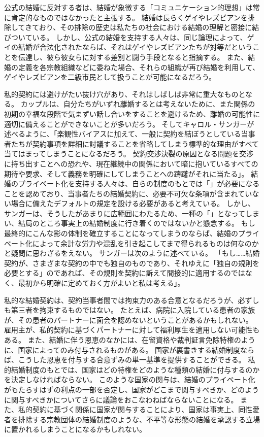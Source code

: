 \documentclass[paper=a4,book,openany]{jlreq} \usepackage{mystyle}
\begin{document}
公式の結婚に反対する者は、結婚が象徴する「コミュニケーション的理想」は常に肯定的なものではなかったと主張する。
結婚は長らくゲイやレズビアンを排除してきており、その排除の歴史は私たちの社会における結婚の理解と密接に結びついている。
しかし、公式の結婚を支持する人々は、同じ論理によって、ゲイの結婚が合法化されたならば、それはゲイやレズビアンたちが対等だということを伝達し、彼ら彼女らに対する差別と闘う手段となると指摘する。
また、結婚の定義を各宗教組織などに委ねた場合、それらの組織が再び結婚を利用して、ゲイやレズビアンを二級市民として扱うことが可能になるだろう\citep[cf.][p.205]{hartley12:_polit_liber_marriag_famil}。

私的契約には避けがたい抜け穴があり、それはしばしば非常に重大なものとなる。
カップルは、自分たちがいずれ離婚するとは考えないために、また関係の初期の幸福な段階で気まずい話し合いをすることを避けるため、離婚の可能性に適切に備えることができないことが多いだろう。
そしてキャロル・サンガーが述べるように、「楽観性バイアスに加えて、一般に契約を結ぼうとしている当事者たちが契約事項を詳細に討議することを省略してしまう標準的な理由がすべて当てはまってしまうことになるだろう。
契約交渉決裂の原因となる問題を交渉に持ち出すことへの恐れや、現在継続中の関係において暗に抱いているすべての期待や要求、そして義務を明確にしてしまうことへの躊躇がそれに当たる」\citep[p.1315]{sanger06:_case_civil_marriag}。
結婚のプライベート化を支持する人々は、自らの制度のもとでは「」が必要になることを認めており、当事者たちの結婚契約に、必要不可欠な条項が含まれていない場合に備えたデフォルトの規定を設ける必要があると考えている。
しかし、サンガーは、そうしたがあまりに広範囲にわたるため、一種の「」となってしまい、結局のところ事実上の結婚制度に行き着くのではないかと懸念する。
もし最終的にこんな影の体制を確立することになってしまうのならば、結婚のプライベート化によって余計な労力や混乱を引き起こしてまで得られるものは何なのかと疑問に思わざるをえない。
サンガーは次のように述べている。
「もし……結婚契約が、さまざまな契約の中でも独自のものであり、それゆえに「独自の規則を必要とする」のであれば、その規則を契約に訴えて間接的に適用するのではなく、最初から明確に定めておく方がよいと私は考える」\citep[p.1315]{sanger06:_case_civil_marriag}。

私的な結婚契約は、契約当事者間では拘束力のある合意となるだろうが、必ずしも第三者を拘束するものではない。
たとえば、病院に入院している患者の家族が、その患者のパートナーに面会を認めないということがあるかもしれない。
雇用主が、私的契約に基づくパートナーに対して福利厚生を適用しない可能性もある。
また、結婚に伴う恩恵のなかには、在留資格や裁判証言免除特権のように、国家によってのみ付与されるものがある。
国家が裏書きする結婚制度ならば、こうした恩恵を付与する合意ずみの単一基準を提供することができる。
私的結婚制度のもとでは、国家はどの特権をどのような種類の結婚に付与するのかを決定しなければならない。
このような国家の関与は、結婚のプライベート化がもたらすはずの利点の一部を否定し、国家がどこまで関与すべきか、どのように関与すべきかについてさらに議論をおこなわねばならないことになる。
また、私的契約に基づく関係に国家が関与することにより、国家は事実上、同性愛者を排除する宗教団体の結婚制度のような、不平等な形態の結婚を承認する立場に置かれるしまうことになるかもしれない。
\end{document}
